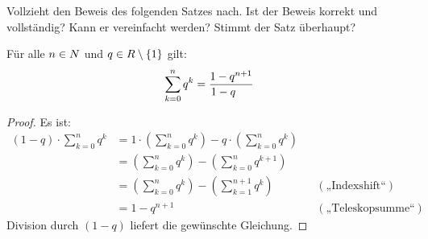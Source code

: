 \begin{aufg} \label{aufg:geometrischereihe}
    Vollzieht den Beweis des folgenden Satzes nach. Ist der Beweis korrekt und vollständig? Kann er vereinfacht werden? Stimmt der Satz überhaupt?
    \begin{satz}
        Für alle $n\in \relax N$ und $q\in \relax R\setminus \{1\}$ gilt:
            \[ \sum_{k=0}^n q^k = \frac{1-q^{n+1}}{\kern-1.4em1-q} \]
    \end{satz}
    \begin{proof}
        Es ist:
        \begin{align*}
            (1-q) \cdot \sum_{k=0}^n q^k & = 1\cdot \left( \sum_{k=0}^n q^k \right) - q\cdot \left( \sum_{k=0}^n q^k \right) \\
            & = \left( \sum_{k=0}^n q^k \right) - \left( \sum_{k=0}^{n} q^{k+1} \right) \\
            & = \left( \sum_{k=0}^n q^k \right) - \left( \sum_{k=1}^{n+1} q^{k} \right) && (\text{„Indexshift“}) \\
            & = 1 - q^{n+1} && (\text{„Teleskopsumme“})
        \end{align*}
    Division durch $(1-q)$ liefert die gewünschte Gleichung.
    \end{proof}
\end{aufg}

